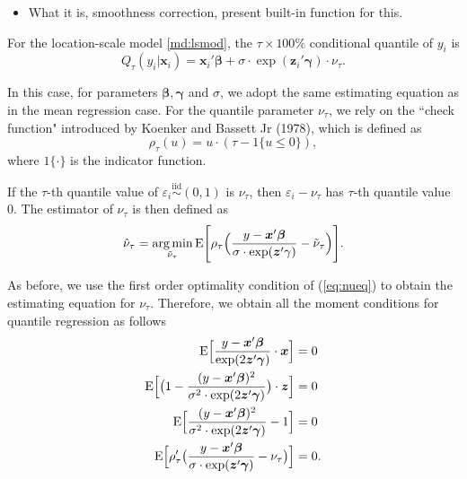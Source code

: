 \documentclass[article]{jss}
\providecommand{\tightlist}{%
  \setlength{\itemsep}{0pt}\setlength{\parskip}{0pt}}
\renewcommand{\|}{\,|\,}
\begin{document}
\begin{itemize}
\tightlist
\item
  What it is, smoothness correction, present built-in function for this.
\end{itemize}

For the location-scale model \eqref{md:lsmod}, the \(\tau\times 100\%\) conditional quantile of \(y_i\) is
\begin{equation} \label{eq:lsqr}
  Q_{\tau}(y_i|\bm x_i) = \bm x_i' \bm \beta+ \sigma\cdot\exp(\bm z_i' \bm \gamma)\cdot\nu_{\tau}.
\end{equation}

In this case, for parameters \(\bm \beta,\bm \gamma\) and \(\sigma\), we adopt the same estimating equation as in the mean regression case. For the quantile parameter \(\nu_{\tau}\), we rely on the ``check function" introduced by Koenker and Bassett Jr (1978), which is defined as
\begin{equation}\label{eq:check}
\rho_\tau(u) = u\cdot(\tau - \mathfrak 1 \{u \le 0\}),
\end{equation}
where \(\mathfrak 1\{\cdot\}\) is the indicator function.

If the \(\tau\)-th quantile value of \(\varepsilon_i\stackrel {\textrm{iid}}{\sim}(0,1)\) is \(\nu_{\tau}\), then \(\varepsilon_i-\nu_{\tau}\) has \(\tau\)-th quantile value \(0\). The estimator of \(\nu_{\tau}\) is then defined as
\begin{equation}\label{eq:nueq}
  \hat\nu_{\tau} = \mathop{\mathrm{arg\,min}}_{\tilde\nu_{\tau}} \textrm{E}\Biggl[\rho_{\tau}\Bigl(\frac{y-\bm x'\bm \beta}{\sigma\cdot\exp(\bm z'\gamma)}-\tilde\nu_{\tau}\Bigr)\Biggr].
\end{equation}

As before, we use the first order optimality condition of (\ref{eq:nueq}) to obtain the estimating equation for \(\nu_{\tau}\). Therefore, we obtain all the moment conditions for quantile regression as follows
\begin{equation} \label{eq:qrls}
\begin{split}
  \textrm{E}\Bigl[\frac{y-\bm x'\bm \beta}{\exp(2\bm z'\bm \gamma)}\cdot\bm x\Bigr] &= 0 \\
  \textrm{E}\Bigl[\bigl(1-\frac{(y-\bm x'\bm \beta)^2}{\sigma^2\cdot\exp(2\bm z'\bm \gamma)}\bigr)\cdot\bm z\Bigr] &= 0 \\
  \textrm{E}\Bigl[\frac{(y-\bm x'\bm \beta)^2}{\sigma^2\cdot\exp(2\bm z'\bm \gamma)}-1\Bigr] &= 0 \\
  \textrm{E}\Bigl[\rho'_{\tau}\bigl(\frac{y-\bm x'\bm \beta}{\sigma\cdot\exp(\bm z'\bm \gamma)}-\nu_{\tau}\bigr)\Bigr] &= 0.
\end{split}
\end{equation}
\end{document}
